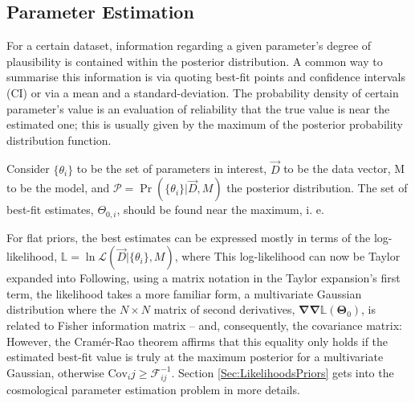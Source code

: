 \subsection{Parameter Estimation}\label{Sec:ParamEstSampling}
For a certain dataset, information regarding a given parameter's degree of plausibility is contained within the posterior distribution. A common way to summarise this information is via quoting best-fit points and confidence intervals (CI) or via a mean and a standard-deviation. The probability density of certain parameter's value is an evaluation of reliability that the true value is near the estimated one; this is usually given by the maximum of the posterior probability distribution function.

\qquad Consider $\{\theta_i\}$ to be the set of parameters in interest, $\vec{D}$ to be the data vector, M to be the model, and $\mathcal{P} = \Pr(\{\theta_i\}|\vec{D}, M)$ the posterior distribution. The set of best-fit estimates, $\Theta_{0,i}$, should be found near the maximum, i. e.

\qquad For flat priors, the best estimates can be expressed mostly in terms of the log-likelihood, $\mathbb{L} = \ln \mathcal{L}(\vec{D}|\{\theta_i\},M)$, where 
This log-likelihood can now be Taylor expanded into
Following, using a matrix notation in the Taylor expansion's first term, the likelihood takes a more familiar form,
a multivariate Gaussian distribution where the $N\times N$ matrix of second derivatives, $\bm{\nabla\nabla}\mathbb{L}(\mathbf{\Theta}_0)$, is related to Fisher information matrix -- and, consequently, the covariance matrix:
However, the Cram\'er-Rao theorem affirms that this equality only holds if the estimated best-fit value is truly at the maximum posterior for a multivariate Gaussian, otherwise $\text{Cov}_ij \geq \mathcal{F}^{-1}_{ij}$. Section \ref{Sec:LikelihoodsPriors} gets into the cosmological parameter estimation problem in more details.

